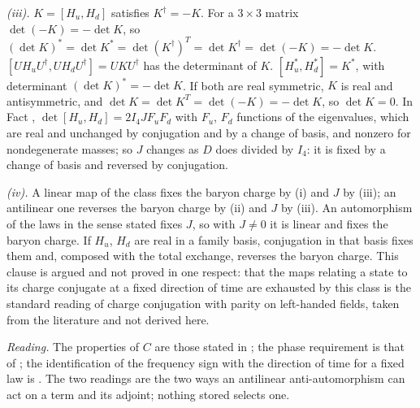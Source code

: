 \emph{(iii).} $K = [H_{u}, H_{d}]$ satisfies $K^{\dagger} = -K$. For a $3 \times 3$ matrix $\det(-K) = -\det K$, so $(\det K)^{*} = \det K^{*} = \det (K^{\dagger})^{T} = \det K^{\dagger} = \det(-K) = -\det K$. $[UH_{u}U^{\dagger}, UH_{d}U^{\dagger}] = UKU^{\dagger}$ has the determinant of $K$. $[H_{u}^{*}, H_{d}^{*}] = K^{*}$, with determinant $(\det K)^{*} = -\det K$. If both are real symmetric, $K$ is real and antisymmetric, and $\det K = \det K^{T} = \det(-K) = -\det K$, so $\det K = 0$. In Fact , $\det[H_{u}, H_{d}] = 2I_{4}J F_{u}F_{d}$ with $F_{u}$, $F_{d}$ functions of the eigenvalues, which are real and unchanged by conjugation and by a change of basis, and nonzero for nondegenerate masses; so $J$ changes as $D$ does divided by $I_{4}$: it is fixed by a change of basis and reversed by conjugation.

\emph{(iv).} A linear map of the class fixes the baryon charge by (i) and $J$ by (iii); an antilinear one reverses the baryon charge by (ii) and $J$ by (iii). An automorphism of the laws in the sense stated fixes $J$, so with $J \neq 0$ it is linear and fixes the baryon charge. If $H_{u}$, $H_{d}$ are real in a family basis, conjugation in that basis fixes them and, composed with the total exchange, reverses the baryon charge. This clause is argued and not proved in one respect: that the maps relating a state to its charge conjugate at a fixed direction of time are exhausted by this class is the standard reading of charge conjugation with parity on left-handed fields, taken from the literature and not derived here.

\emph{Reading.} The properties of $C$ are those stated in ; the phase requirement is that of ; the identification of the frequency sign with the direction of time for a fixed law is . The two readings are the two ways an antilinear anti-automorphism can act on a term and its adjoint; nothing stored selects one.
